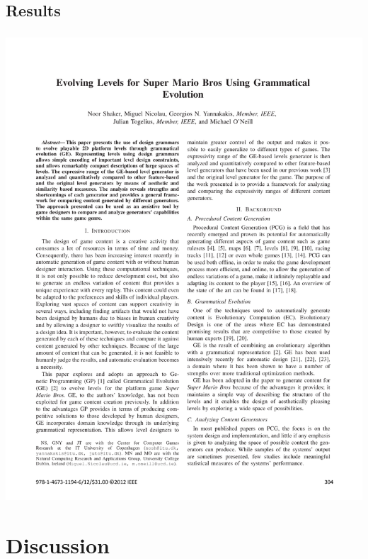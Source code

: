 \documentclass{beamer}
\makeatletter
\newcommand*{\currentname}{\@currentlabelname}
\makeatother
\begin{document}
\subsection{Results}
\begin{frame}
\frametitle{\currentname}
\includegraphics[page=5, trim={11cm 15.5cm 1.5cm 8cm}, clip, scale=1.1]{Mario_GE.pdf}
\end{frame}



\section{Discussion}
\end{document}
